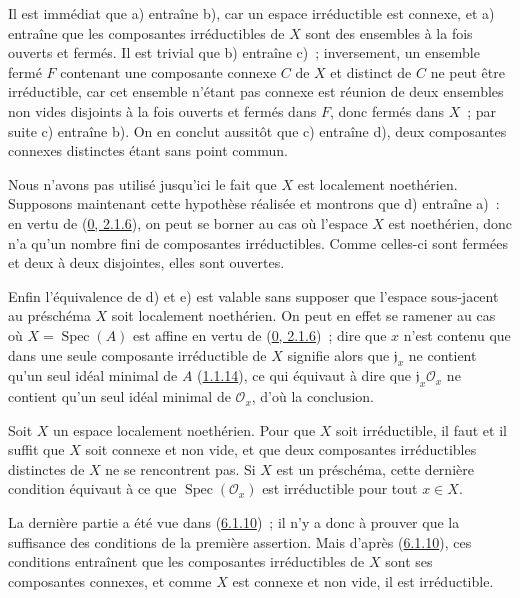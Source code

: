 Il est immédiat que a) entraîne b), car un espace irréductible est connexe, et
a) entraîne que les composantes irréductibles de $X$ sont des ensembles à la
fois ouverts et fermés. Il est trivial que b) entraîne c)~; inversement, un
ensemble fermé $F$ contenant
une composante connexe $C$ de $X$ et distinct de $C$ ne peut être
irréductible, car cet ensemble n'étant pas connexe est réunion de deux
ensembles non vides disjoints à la fois ouverts et fermés dans $F$, donc
fermés dans $X$~; par suite c) entraîne b). On en conclut aussitôt que c)
entraîne d), deux composantes connexes distinctes étant sans point commun.

Nous n'avons pas utilisé jusqu'ici le fait que $X$ est localement noethérien.
Supposons maintenant cette hypothèse réalisée et montrons que d) entraîne
a)~: en vertu de (\hyperref[0.2.1.6-fr]{0, 2.1.6}), on peut se borner au cas
où l'espace $X$ est noethérien, donc n'a qu'un nombre fini de composantes
irréductibles. Comme celles-ci sont fermées et deux à deux disjointes, elles
sont ouvertes.

Enfin l'équivalence de d) et e) est valable sans supposer que l'espace
sous-jacent au préschéma $X$ soit localement noethérien. On peut en effet se
ramener au cas où $X=\operatorname{Spec}(A)$ est affine en vertu de
(\hyperref[0.2.1.6-fr]{0, 2.1.6})~; dire que $x$ n'est contenu que dans une
seule composante irréductible de $X$ signifie alors que $\mathfrak{j}_x$ ne
contient qu'un seul idéal minimal de $A$ (\hyperref[I.1.1.14-fr]{1.1.14}), ce
qui équivaut à dire que $\mathfrak{j}_x\mathscr{O}_x$ ne contient qu'un seul
idéal minimal de $\mathscr{O}_x$, d'où la conclusion.

\begin{corollary}[6.1.11]
\label{I.6.1.11-fr}
Soit $X$ un espace localement noethérien. Pour que $X$ soit irréductible, il
faut et il suffit que $X$ soit connexe et non vide, et que deux composantes
irréductibles distinctes de $X$ ne se rencontrent pas. Si $X$ est un
préschéma, cette dernière condition équivaut à ce que
$\operatorname{Spec}(\mathscr{O}_x)$ est irréductible pour tout $x\in X$.
\end{corollary}

La dernière partie a été vue dans (\hyperref[I.6.1.10-fr]{6.1.10})~; il n'y a
donc à prouver que la suffisance des conditions de la première assertion.
Mais d'après (\hyperref[I.6.1.10-fr]{6.1.10}), ces conditions entraînent que
les composantes irréductibles de $X$ sont ses composantes connexes, et comme
$X$ est connexe et non vide, il est irréductible.

